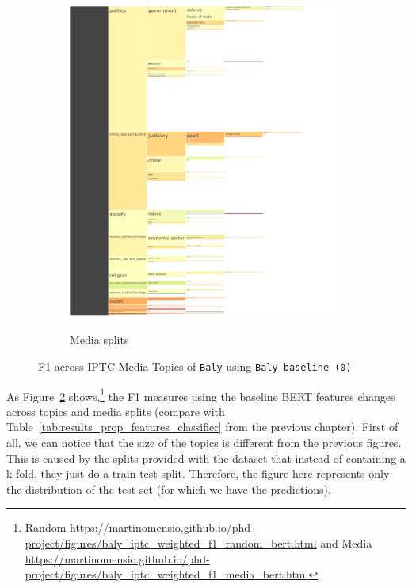\begin{figure}[!htbp]
\begin{subfigure}{0.49\textwidth}
    \href{https://martinomensio.github.io/phd-project/figures/baly_iptc_weighted_f1_media_bert.html}{\includegraphics[trim={2.65cm 0cm 0cm 0cm},clip,width=\linewidth]{figures/baly_iptc_weighted_f1_media_bert.pdf}}
    \caption{Media splits}
    \label{fig:baly_iptc_weighted_f1_media_bert}
\end{subfigure}
\caption{F1 across IPTC Media Topics of \texttt{Baly} using \texttt{Baly-baseline (0)}}
    \label{fig:baly_iptc_weighted_f1_bert}
\end{figure}

As Figure~\ref{fig:baly_iptc_weighted_f1_bert} shows,\footnote{Random \url{https://martinomensio.github.io/phd-project/figures/baly_iptc_weighted_f1_random_bert.html} and Media \url{https://martinomensio.github.io/phd-project/figures/baly_iptc_weighted_f1_media_bert.html}} the F1 measures using the baseline BERT features changes across topics and media splits (compare with Table~\ref{tab:results_prop_features_classifier} from the previous chapter).
First of all, we can notice that the size of the topics is different from the previous figures. This is caused by the splits provided with the dataset that instead of containing a k-fold, they just do a train-test split. Therefore, the figure here represents only the distribution of the test set (for which we have the predictions).

